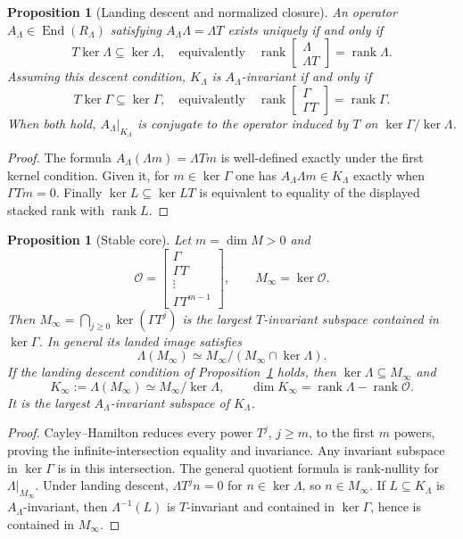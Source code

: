 \documentclass[11pt]{amsart}
\newtheorem{proposition}[theorem]{Proposition}
\theoremstyle{definition}
\newcommand{\End}{\operatorname{End}}
\newcommand{\rankp}{\operatorname{rank}}
\begin{document}
\begin{proposition}[Landing descent and normalized closure]\label{prop:closure}
An operator \(A_\Lambda\in\End(R_\Lambda)\) satisfying
\(A_\Lambda\Lambda=\Lambda T\) exists uniquely if and only if
\[
T\ker\Lambda\subseteq\ker\Lambda,
\quad\text{equivalently}\quad
\rankp\begin{bmatrix}\Lambda\\\Lambda T\end{bmatrix}=\rankp\Lambda.
\]
Assuming this descent condition, \(K_\Lambda\) is \(A_\Lambda\)-invariant if and only if
\[
T\ker\Gamma\subseteq\ker\Gamma,
\quad\text{equivalently}\quad
\rankp\begin{bmatrix}\Gamma\\\Gamma T\end{bmatrix}=\rankp\Gamma.
\]
When both hold, \(A_\Lambda|_{K_\Lambda}\) is conjugate to the operator induced by \(T\)
on \(\ker\Gamma/\ker\Lambda\).
\end{proposition}
\begin{proof}
The formula \(A_\Lambda(\Lambda m)=\Lambda Tm\) is well-defined exactly under
the first kernel condition. Given it, for \(m\in\ker\Gamma\) one has
\(A_\Lambda\Lambda m\in K_\Lambda\) exactly when \(\Gamma Tm=0\).
Finally \(\ker L\subseteq\ker LT\) is equivalent to equality of the displayed
stacked rank with \(\rankp L\).
\end{proof}

\begin{proposition}[Stable core]\label{prop:stable}
Let \(m=\dim M>0\) and
\[
\mathcal O=
\begin{bmatrix}\Gamma\\\Gamma T\\ \vdots\\\Gamma T^{m-1}\end{bmatrix},
\qquad M_\infty=\ker\mathcal O.
\]
Then \(M_\infty=\bigcap_{j\ge0}\ker(\Gamma T^j)\) is the largest \(T\)-invariant
subspace contained in \(\ker\Gamma\). In general its landed image satisfies
\[
\Lambda(M_\infty)\simeq
M_\infty/(M_\infty\cap\ker\Lambda).
\]
If the landing descent condition of Proposition~\ref{prop:closure} holds, then
\(\ker\Lambda\subseteq M_\infty\) and
\[
K_\infty:=\Lambda(M_\infty)\simeq M_\infty/\ker\Lambda,\qquad
\dim K_\infty=\rankp\Lambda-\rankp\mathcal O.
\]
It is the largest \(A_\Lambda\)-invariant subspace of \(K_\Lambda\).
\end{proposition}
\begin{proof}
Cayley--Hamilton reduces every power \(T^j\), \(j\ge m\), to the first \(m\)
powers, proving the infinite-intersection equality and invariance. Any invariant
subspace in \(\ker\Gamma\) is in this intersection. The general quotient formula
is rank-nullity for \(\Lambda|_{M_\infty}\). Under landing descent,
\(\Lambda T^j n=0\) for \(n\in\ker\Lambda\), so \(n\in M_\infty\).
If \(L\subseteq K_\Lambda\) is \(A_\Lambda\)-invariant, then \(\Lambda^{-1}(L)\)
is \(T\)-invariant and contained in \(\ker\Gamma\), hence is contained in \(M_\infty\).
\end{proof}
\end{document}
